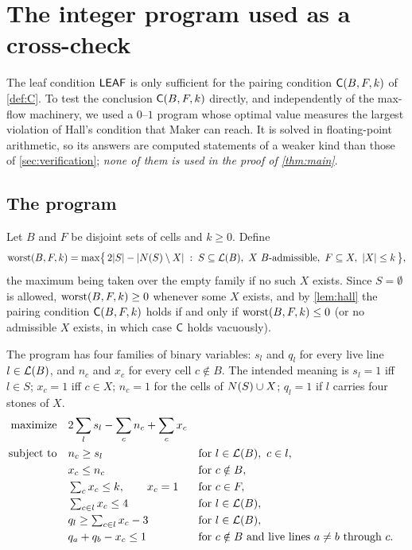 \section{The integer program used as a cross-check}\label{sec:ip}


The leaf condition $\mathsf{LEAF}$ is only sufficient for the pairing condition $\mathsf{C}(B,F,k)$ of \cref{def:C}.
To test the conclusion $\mathsf{C}(B,F,k)$ directly, and independently of the max-flow machinery, we used a
$0$--$1$ program whose optimal value measures the largest violation of Hall's condition that Maker can
reach. It is solved in floating-point arithmetic, so its answers are computed statements of a weaker kind
than those of \cref{sec:verification}; \emph{none of them is used in the proof of \cref{thm:main}}.

\subsection{The program}\label{ssec:ip-model}

Let $B$ and $F$ be disjoint sets of cells and $k\ge 0$. Define
\[
\operatorname{worst}(B,F,k)=\max\bigl\{\,2|S|-|N(S)\setminus X|\;:\; S\subseteq\mathcal{L}(B),\ X \text{ $B$-admissible},\
F\subseteq X,\ |X|\le k\,\bigr\},
\]
the maximum being taken over the empty family if no such $X$ exists. Since $S=\emptyset$ is allowed,
$\operatorname{worst}(B,F,k)\ge0$ whenever some $X$ exists, and by \cref{lem:hall} the pairing condition $\mathsf{C}(B,F,k)$ holds
if and only if $\operatorname{worst}(B,F,k)\le 0$ (or no admissible $X$ exists, in which case $\mathsf{C}$ holds vacuously).

The program has four families of binary variables: $s_l$ and $q_l$ for every live line $l\in\mathcal{L}(B)$, and
$n_c$ and $x_c$ for every cell $c\notin B$. The intended meaning is $s_l=1$ iff $l\in S$; $x_c=1$ iff
$c\in X$; $n_c=1$ for the cells of $N(S)\cup X$; $q_l=1$ if $l$ carries four stones of $X$.
\begin{align}
\text{maximize}\quad & 2\sum_{l}s_l-\sum_{c}n_c+\sum_{c}x_c \label{eq:ip-obj}\\
\text{subject to}\quad
 & n_c\ge s_l && \text{for } l\in\mathcal{L}(B),\ c\in l, \label{eq:ip-n}\\
 & x_c\le n_c && \text{for } c\notin B, \label{eq:ip-xn}\\
 & \textstyle\sum_{c}x_c\le k,\qquad x_c=1 && \text{for } c\in F, \label{eq:ip-k}\\
 & \textstyle\sum_{c\in l}x_c\le 4 && \text{for } l\in\mathcal{L}(B), \label{eq:ip-cap}\\
 & \textstyle q_l\ge\sum_{c\in l}x_c-3 && \text{for } l\in\mathcal{L}(B), \label{eq:ip-q}\\
 & q_a+q_b-x_c\le 1 && \text{for } c\notin B \text{ and live lines } a\neq b \text{ through } c. \label{eq:ip-danger}
\end{align}

